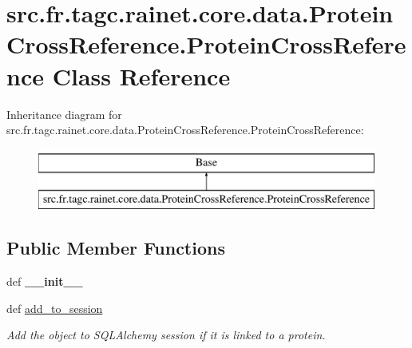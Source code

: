 \hypertarget{classsrc_1_1fr_1_1tagc_1_1rainet_1_1core_1_1data_1_1ProteinCrossReference_1_1ProteinCrossReference}{\section{src.\-fr.\-tagc.\-rainet.\-core.\-data.\-Protein\-Cross\-Reference.\-Protein\-Cross\-Reference Class Reference}
\label{classsrc_1_1fr_1_1tagc_1_1rainet_1_1core_1_1data_1_1ProteinCrossReference_1_1ProteinCrossReference}
}
Inheritance diagram for src.\-fr.\-tagc.\-rainet.\-core.\-data.\-Protein\-Cross\-Reference.\-Protein\-Cross\-Reference\-:\begin{figure}[H]
\begin{center}
\leavevmode
\includegraphics[height=2.000000cm]{classsrc_1_1fr_1_1tagc_1_1rainet_1_1core_1_1data_1_1ProteinCrossReference_1_1ProteinCrossReference}
\end{center}
\end{figure}
\subsection*{Public Member Functions}
\begin{DoxyCompactItemize}
\item 
\hypertarget{classsrc_1_1fr_1_1tagc_1_1rainet_1_1core_1_1data_1_1ProteinCrossReference_1_1ProteinCrossReference_a12fdf9070f67540cb6824d36519d6c77}{def {\bfseries \-\_\-\-\_\-init\-\_\-\-\_\-}}\label{classsrc_1_1fr_1_1tagc_1_1rainet_1_1core_1_1data_1_1ProteinCrossReference_1_1ProteinCrossReference_a12fdf9070f67540cb6824d36519d6c77}

\item 
\hypertarget{classsrc_1_1fr_1_1tagc_1_1rainet_1_1core_1_1data_1_1ProteinCrossReference_1_1ProteinCrossReference_a87761c82840261a383c27ae468727c56}{def \hyperlink{classsrc_1_1fr_1_1tagc_1_1rainet_1_1core_1_1data_1_1ProteinCrossReference_1_1ProteinCrossReference_a87761c82840261a383c27ae468727c56}{add\-\_\-to\-\_\-session}}\label{classsrc_1_1fr_1_1tagc_1_1rainet_1_1core_1_1data_1_1ProteinCrossReference_1_1ProteinCrossReference_a87761c82840261a383c27ae468727c56}

\begin{DoxyCompactList}\small\item\em Add the object to S\-Q\-L\-Alchemy session if it is linked to a protein. \end{DoxyCompactList}\end{DoxyCompactItemize}
